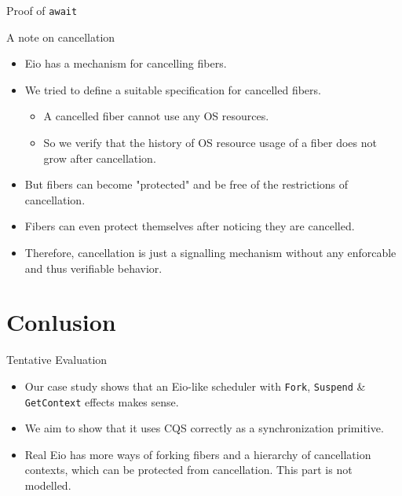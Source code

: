 \documentclass[aspectratio=43]{beamer}
\newcommand{\ocaml}[1]{\texttt{#1}}
\newcommand{\efork}{\ocaml{Fork}}
\newcommand{\esuspend}{\ocaml{Suspend}}
\newcommand{\egetctx}{\ocaml{GetContext}}
\begin{document}
\begin{frame}[fragile]{Proof of \ocaml{await}}
\end{frame}


\begin{frame}{A note on cancellation}
    \begin{itemize}
        \item Eio has a mechanism for cancelling fibers.
        \item We tried to define a suitable specification for cancelled fibers.
              \begin{itemize}
                  \item A cancelled fiber cannot use any OS resources.
                  \item So we verify that the history of OS resource usage of a fiber does not grow after cancellation.
              \end{itemize}
        \item But fibers can become "protected" and be free of the restrictions of cancellation.
        \item Fibers can even protect themselves after noticing they are cancelled.
        \item Therefore, cancellation is just a signalling mechanism without any enforcable and thus verifiable behavior.
    \end{itemize}
\end{frame}

\section{Conlusion}
\begin{frame}{Tentative Evaluation}
    \begin{itemize}
        \item Our case study shows that an Eio-like scheduler with \efork{}, \esuspend{} \& \egetctx{} effects makes sense.
        \item We aim to show that it uses CQS correctly as a synchronization primitive.
        \item Real Eio has more ways of forking fibers and a hierarchy of cancellation contexts, which can be protected from cancellation. This part is not modelled.
    \end{itemize}
\end{frame}
\end{document}
